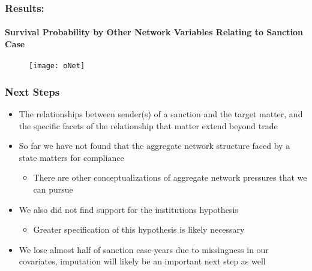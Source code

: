 \begin{frame}
\frametitle{Results:}	
\framesubtitle{Survival Probability by Other Network Variables Relating to Sanction Case}

\begin{figure}[ht]
	\centering
	\texttt{[image: oNet]}
\end{figure}

\end{frame}

\begin{frame}
\frametitle{Next Steps}

\begin{itemize}
	\item The relationships between sender(s) of a sanction and the target matter, and the specific facets of the relationship that matter extend beyond trade
	\item So far we have not found that the aggregate network structure faced by a state matters for compliance
	\begin{itemize}
		\item There are other conceptualizations of aggregate network pressures that we can pursue
	\end{itemize}
	\item We also did not find support for the institutions hypothesis
	\begin{itemize}
		\item Greater specification of this hypothesis is likely necessary
	\end{itemize}
	\item We lose almost half of sanction case-years due to missingness in our covariates, imputation will likely be an important next step as well
\end{itemize}
\end{frame}
